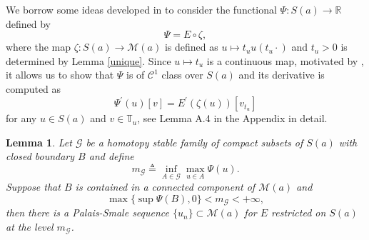 \documentclass[11pt]{amsart}
\numberwithin{equation}{section}
\newtheorem{lemma}[theorem]{Lemma}
\theoremstyle{definition}
\newcommand{\R}{\mathbb{R}}
\begin{document}
We borrow some ideas developed in \cite{BartschSoave2,SzulkinWeth} to consider the functional
$\Psi:S(a)\to\R$ defined by
\[
\Psi= E\circ \zeta,
\]
where the map $\zeta:S(a)\to \mathcal{M}(a)$ is defined as $u\mapsto t_uu(t_u\cdot)$
and $t_u>0$ is determined by Lemma \ref{unique}.
Since $u\mapsto t_u$ is a continuous map, motivated by \cite[Proposition 2.9]{SzulkinWeth},
 it allows us to show that $\Psi$ is of $\mathcal{C}^1$ class over $S(a)$
and its derivative is computed as
\begin{equation}\label{derivative}
\Psi^\prime(u)[v]  =E^\prime(\zeta(u))[v_{t_u}]
\end{equation}
for any $u\in S(a)$ and $v\in \mathbb{T}_u$, see Lemma A.4 in the Appendix in detail.

\begin{lemma}\label{PSsequence}
 Let $\mathcal{G}$ be a homotopy stable family of compact subsets of $S(a)$ with closed boundary $B$ and define
\[
m_\mathcal{G}\triangleq\inf_{A\in \mathcal{G}}\max_{u\in A}\Psi(u).
\]
Suppose that $B$ is contained in a connected component of $\mathcal{M}(a)$ and
\[
\max\{\sup\Psi(B),0\}<m_\mathcal{G}<+\infty,
\]
then there is a Palais-Smale sequence $\{u_n\}\subset\mathcal{M}(a)$ for $E$ restricted on $S(a)$
at the level $m_\mathcal{G}$.
\end{lemma}
\end{document}
